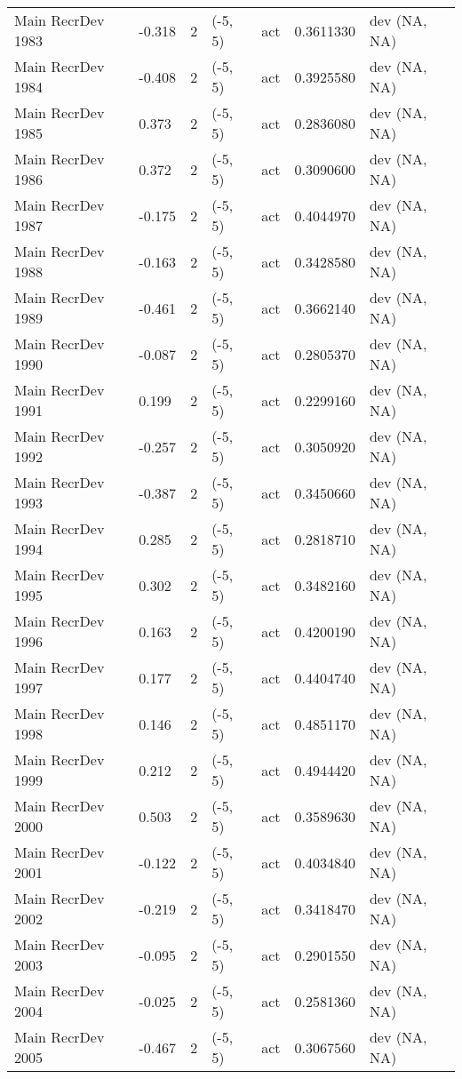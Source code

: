 \documentclass[11pt,
  english,
  letterpaper,
]{article}
\begin{document}
\begin{landscape}
\begin{longtable}[t]{>{\raggedright\arraybackslash}p{7cm}lllll>{\raggedright\arraybackslash}p{4cm}}
Main RecrDev 1983 & -0.318 & 2 & (-5, 5) & act & 0.3611330 & dev (NA, NA)\\
Main RecrDev 1984 & -0.408 & 2 & (-5, 5) & act & 0.3925580 & dev (NA, NA)\\
Main RecrDev 1985 & 0.373 & 2 & (-5, 5) & act & 0.2836080 & dev (NA, NA)\\
Main RecrDev 1986 & 0.372 & 2 & (-5, 5) & act & 0.3090600 & dev (NA, NA)\\
Main RecrDev 1987 & -0.175 & 2 & (-5, 5) & act & 0.4044970 & dev (NA, NA)\\
Main RecrDev 1988 & -0.163 & 2 & (-5, 5) & act & 0.3428580 & dev (NA, NA)\\
Main RecrDev 1989 & -0.461 & 2 & (-5, 5) & act & 0.3662140 & dev (NA, NA)\\
Main RecrDev 1990 & -0.087 & 2 & (-5, 5) & act & 0.2805370 & dev (NA, NA)\\
Main RecrDev 1991 & 0.199 & 2 & (-5, 5) & act & 0.2299160 & dev (NA, NA)\\
Main RecrDev 1992 & -0.257 & 2 & (-5, 5) & act & 0.3050920 & dev (NA, NA)\\
Main RecrDev 1993 & -0.387 & 2 & (-5, 5) & act & 0.3450660 & dev (NA, NA)\\
Main RecrDev 1994 & 0.285 & 2 & (-5, 5) & act & 0.2818710 & dev (NA, NA)\\
Main RecrDev 1995 & 0.302 & 2 & (-5, 5) & act & 0.3482160 & dev (NA, NA)\\
Main RecrDev 1996 & 0.163 & 2 & (-5, 5) & act & 0.4200190 & dev (NA, NA)\\
Main RecrDev 1997 & 0.177 & 2 & (-5, 5) & act & 0.4404740 & dev (NA, NA)\\
Main RecrDev 1998 & 0.146 & 2 & (-5, 5) & act & 0.4851170 & dev (NA, NA)\\
Main RecrDev 1999 & 0.212 & 2 & (-5, 5) & act & 0.4944420 & dev (NA, NA)\\
Main RecrDev 2000 & 0.503 & 2 & (-5, 5) & act & 0.3589630 & dev (NA, NA)\\
Main RecrDev 2001 & -0.122 & 2 & (-5, 5) & act & 0.4034840 & dev (NA, NA)\\
Main RecrDev 2002 & -0.219 & 2 & (-5, 5) & act & 0.3418470 & dev (NA, NA)\\
Main RecrDev 2003 & -0.095 & 2 & (-5, 5) & act & 0.2901550 & dev (NA, NA)\\
Main RecrDev 2004 & -0.025 & 2 & (-5, 5) & act & 0.2581360 & dev (NA, NA)\\
Main RecrDev 2005 & -0.467 & 2 & (-5, 5) & act & 0.3067560 & dev (NA, NA)\\

\end{longtable}
\end{landscape}
\end{document}
